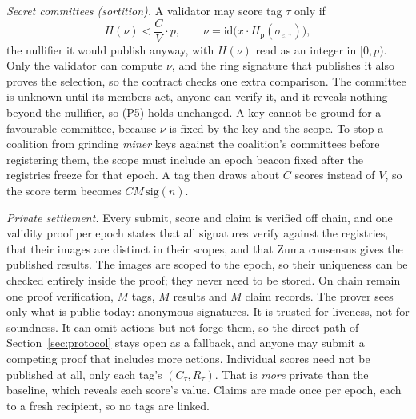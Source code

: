 \documentclass[11pt]{article}
\theoremstyle{remark}
\newcommand{\Hp}{H_{\mathrm{p}}}
\newcommand{\Hs}{H}
\newcommand{\tg}{\tau}
\begin{document}
\emph{Secret committees (sortition).} A validator may score tag $\tg$ only if
\[
\Hs(\nu) < \frac{C}{V}\cdot p, \qquad \nu = \mathrm{id}\big(x\cdot\Hp(\sigma_{e,\tg})\big),
\]
the nullifier it would publish anyway, with $\Hs(\nu)$ read as an integer in $[0,p)$. Only the validator can compute $\nu$, and the ring signature that publishes it also proves the selection, so the contract checks one extra comparison. The committee is unknown until its members act, anyone can verify it, and it reveals nothing beyond the nullifier, so (P5) holds unchanged. A key cannot be ground for a favourable committee, because $\nu$ is fixed by the key and the scope. To stop a coalition from grinding \emph{miner} keys against the coalition's committees before registering them, the scope must include an epoch beacon fixed after the registries freeze for that epoch. A tag then draws about $C$ scores instead of $V$, so the score term becomes $CM\,\mathrm{sig}(n)$.

\emph{Private settlement.} Every submit, score and claim is verified off chain, and one validity proof per epoch states that all signatures verify against the registries, that their images are distinct in their scopes, and that Zuma consensus gives the published results. The images are scoped to the epoch, so their uniqueness can be checked entirely inside the proof; they never need to be stored. On chain remain one proof verification, $M$ tags, $M$ results and $M$ claim records. The prover sees only what is public today: anonymous signatures. It is trusted for liveness, not for soundness. It can omit actions but not forge them, so the direct path of Section~\ref{sec:protocol} stays open as a fallback, and anyone may submit a competing proof that includes more actions. Individual scores need not be published at all, only each tag's $(C_\tg,R_\tg)$. That is \emph{more} private than the baseline, which reveals each score's value. Claims are made once per epoch, each to a fresh recipient, so no tags are linked.
\end{document}
